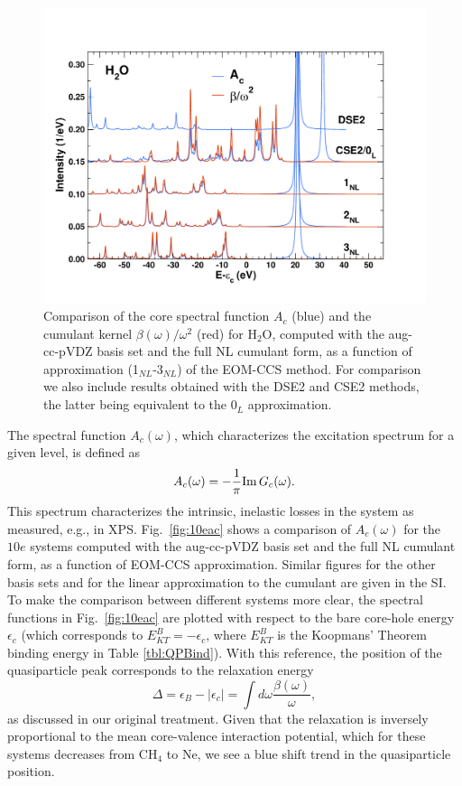 \documentclass[aps,prb,twocolumn,groupaddress,floatfix]{revtex4}
\begin{document}
\begin{figure}[t]
\includegraphics[scale=0.36,
trim=1.0cm 1.5cm 0.0cm 2.0cm,clip]{Fig02.pdf}
\caption{\label{fig:h2o_beta}
Comparison of the core spectral function $A_c$ (blue) and the cumulant kernel $\beta(\omega)/\omega^2$ (red) for H$_2$O, computed with the aug-cc-pVDZ basis set and the full NL cumulant form, as a function of approximation (1$_{NL}$-3$_{NL}$) of the EOM-CCS method. For comparison we also include results obtained with the DSE2 and CSE2 methods, the latter being equivalent to the 0$_L$ approximation.
}
\end{figure}

The spectral function $A_c(\omega)$, which
characterizes the excitation spectrum for a given level, 
is defined as
\begin{equation}
A_{c}(\omega) = -\frac{1}{\pi} {\rm Im}\, G_{c}(\omega).
\end{equation}
This spectrum characterizes the intrinsic, inelastic losses in the
system as measured, e.g., in XPS.
Fig.\ \ref{fig:10eac} shows a comparison of $A_c(\omega)$ for the
$10e$ systems computed with the aug-cc-pVDZ basis set and the full NL cumulant
form, as a function of EOM-CCS approximation. Similar figures for the other
basis sets and for the linear approximation to the cumulant are given in the
SI.
To make the comparison between different systems more clear, the spectral
functions in Fig.\ \ref{fig:10eac} are plotted with respect to the bare
core-hole energy $\epsilon_c$ (which corresponds to $E^{B}_{KT} = -\epsilon_c$,
where $E^{B}_{KT}$ is the Koopmans' Theorem binding energy in Table
\ref{tbl:QPBind}). With this reference, the position of the quasiparticle peak
corresponds to the relaxation energy
\begin{equation}
\Delta=\epsilon_B-|\epsilon_c| = \int d\omega \frac{\beta(\omega)}{\omega},
\end{equation}
as discussed in our original treatment.\cite{RVKNKP} Given that the relaxation
is inversely proportional to the mean core-valence interaction potential, which
for these systems decreases from CH$_4$ to Ne, we see a blue shift trend in the
quasiparticle position.
\end{document}
